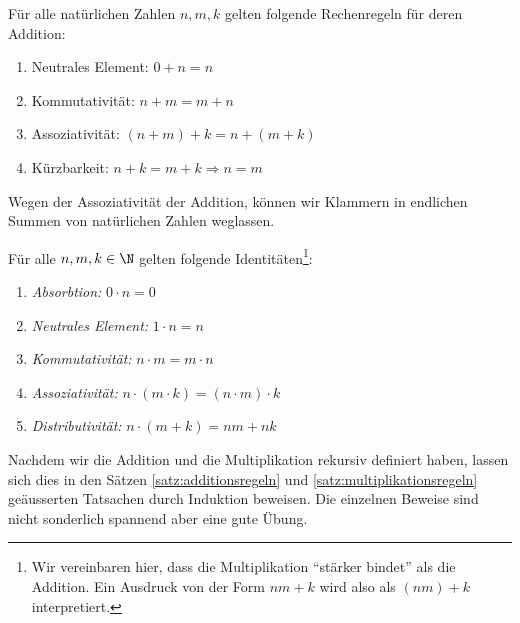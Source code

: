 \begin{lemma}\label{satz:additionsregeln}
Für alle natürlichen Zahlen $n,m,k$ gelten folgende Rechenregeln für deren Addition:
\begin{enumerate}
\item Neutrales Element: $0+n=n$
\item Kommutativität: $n+m=m+n$
\item Assoziativität: $(n+m)+k=n+(m+k)$
\item Kürzbarkeit: $n+k=m+k\Rightarrow n=m$
\end{enumerate}
\end{lemma}


\begin{remark}
Wegen der Assoziativität der Addition, können wir Klammern in endlichen Summen von natürlichen Zahlen weglassen.
\end{remark}




\begin{lemma}\label{satz:multiplikationsregeln}
Für alle $n,m,k\in\N$ gelten folgende Identitäten\footnote{Wir vereinbaren hier, dass die Multiplikation ``stärker bindet'' als die Addition. Ein Ausdruck von der Form $nm+k$ wird also als $(nm)+k$ interpretiert.}:
\begin{enumerate}
\item \textit{Absorbtion:} $0\cdot n=0$
\item \textit{Neutrales Element:} $1\cdot n=n$
\item \textit{Kommutativität:} $n\cdot m=m\cdot n$
 \item \textit{Assoziativität:} $n\cdot(m\cdot k)=(n\cdot m)\cdot k$
\item \textit{Distributivität:} $n\cdot(m+k)=nm+nk$
\end{enumerate}
\end{lemma}
\begin{example}
	Nachdem wir die Addition und die Multiplikation rekursiv definiert haben, lassen sich dies in den Sätzen \ref{satz:additionsregeln} und \ref{satz:multiplikationsregeln} geäusserten Tatsachen durch Induktion beweisen. Die einzelnen Beweise sind nicht sonderlich spannend aber eine gute Übung.
\end{example}


